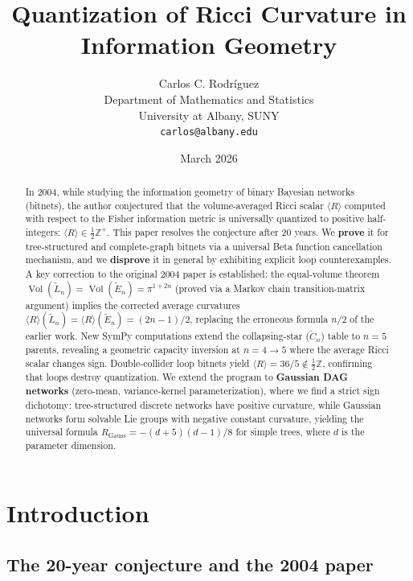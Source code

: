 \documentclass[11pt]{article}
\title{Quantization of Ricci Curvature in Information Geometry}
\author{Carlos C. Rodr\'iguez\\
Department of Mathematics and Statistics\\
University at Albany, SUNY\\
\texttt{carlos@albany.edu}}
\date{March 2026}
\theoremstyle{definition}
\DeclareMathOperator{\Vol}{Vol}
\begin{document}
\maketitle

\begin{abstract}
In 2004, while studying the information geometry of binary Bayesian networks 
(bitnets), the author conjectured that the volume-averaged Ricci scalar 
$\langle R\rangle$ computed with respect to the Fisher information metric 
is universally quantized to positive half-integers: 
$\langle R\rangle\in\tfrac{1}{2}\mathbb{Z}^+$. This paper resolves the 
conjecture after 20 years. We \textbf{prove} it for tree-structured and 
complete-graph bitnets via a universal Beta function cancellation mechanism, 
and we \textbf{disprove} it in general by exhibiting explicit loop counterexamples.
A key correction to the original 2004 paper is established: the equal-volume 
theorem $\Vol(\tilde{L}_n)=\Vol(\tilde{E}_n)=\pi^{1+2n}$ (proved via a Markov 
chain transition-matrix argument) implies the corrected average curvatures 
$\langle R\rangle(\tilde{L}_n)=\langle R\rangle(\tilde{E}_n)=(2n-1)/2$, 
replacing the erroneous formula $n/2$ of the earlier work. New SymPy 
computations extend the collapsing-star ($\tilde{C}_n$) table to $n=5$ 
parents, revealing a geometric capacity inversion at $n=4\to 5$ where 
the average Ricci scalar changes sign. Double-collider loop bitnets 
yield $\langle R\rangle = 36/5 \notin \tfrac{1}{2}\mathbb{Z}$, 
confirming that loops destroy quantization. We extend the program to 
\textbf{Gaussian DAG networks} (zero-mean, variance-kernel parameterization), 
where we find a strict sign dichotomy: tree-structured discrete 
networks have positive curvature, while Gaussian networks form 
solvable Lie groups with negative constant curvature, yielding 
the universal formula $R_{\mathrm{Gauss}} = -(d+5)(d-1)/8$ for 
simple trees, where $d$ is the parameter dimension.
\end{abstract}

\tableofcontents
\newpage

\section{Introduction}

\subsection{The 20-year conjecture and the 2004 paper}
\end{document}
